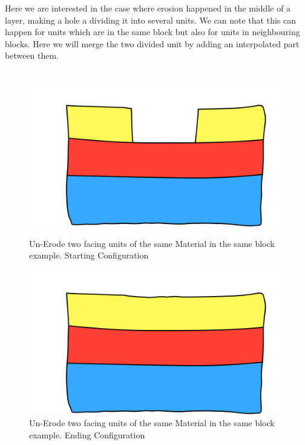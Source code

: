 \documentclass[12pt, a4paper]{report} %
\begin{document}
Here we are interested in the case where erosion happened in the middle of a layer, making a hole a dividing it into several units. We can note that this can happen for units which are in the same block but also for units in neighbouring blocks. Here we will merge the two divided unit by adding an interpolated part between them.\\\\
\begin{figure}[H]
    \begin{minipage}[c]{.46\linewidth}
        \centering
        \includegraphics[scale=0.2]{unErodeTwoLayersDescription0.png}
	\caption{Un-Erode two facing units of the same Material in the same block example. Starting Configuration}
    \end{minipage}
    \hfill%
    \begin{minipage}[c]{.46\linewidth}
        \centering
        \includegraphics[scale=0.2]{unErodeTwoLayersDescription1.png}
	\caption{Un-Erode two facing units of the same Material in the same block example. Ending Configuration}
    \end{minipage}
\end{figure}\\
\end{document}
